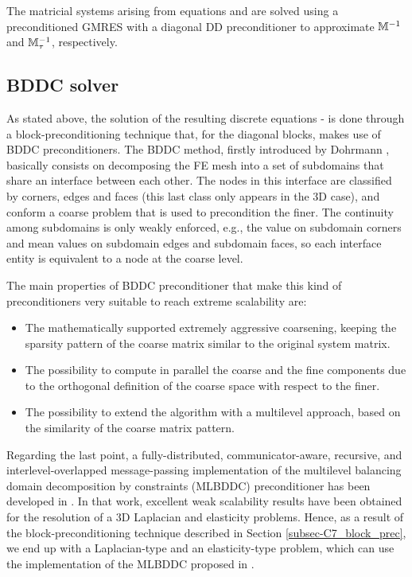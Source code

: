 The matricial systems arising from equations  and  are solved using a preconditioned GMRES with a diagonal DD preconditioner to approximate $ \mathbb{M}^{-1} $ and $ \mathbb{M}_\tau^{-1} $, respectively.

\subsection{BDDC solver}
As stated above, the solution of the resulting discrete equations - is done through a block-preconditioning technique that, for the diagonal blocks, makes use of BDDC preconditioners. The BDDC method, firstly introduced by Dohrmann \cite{dohrmann_preconditioner_2003}, basically consists on decomposing the FE mesh into a set of subdomains that share an interface between each other. The nodes in this interface are classified by corners, edges and faces (this last class only appears in the 3D case), and conform a coarse problem that is used to precondition the finer. The continuity among subdomains is only weakly enforced, e.g., the value on subdomain corners and mean values on subdomain edges and subdomain faces, so each interface entity is equivalent to a node at the coarse level.

The main properties of BDDC preconditioner that make this kind of preconditioners very suitable to reach extreme scalability are: 
\begin{itemize}
\item The mathematically supported extremely aggressive coarsening, keeping the sparsity pattern of the coarse matrix similar to the original system matrix.
\item The possibility to compute in parallel the coarse and the fine components due to the orthogonal definition of the coarse space with respect to the finer.
\item The possibility to extend the algorithm with a multilevel approach, based on the similarity of the coarse matrix pattern.
\end{itemize}

Regarding the last point, a fully-distributed, communicator-aware, recursive, and interlevel-overlapped message-passing implementation of the multilevel balancing domain decomposition by constraints (MLBDDC) preconditioner has been developed in \cite{alberto_f._martin_santiago_badia_and_javier_principe_multilevel_????}. In that work, excellent weak scalability results have been obtained for the resolution of a 3D Laplacian and elasticity problems. Hence, as a result of the block-preconditioning technique described in Section \ref{subsec-C7_block_prec}, we end up with a Laplacian-type and an elasticity-type problem, which can use the implementation of the MLBDDC proposed in \cite{alberto_f._martin_santiago_badia_and_javier_principe_multilevel_????}.

